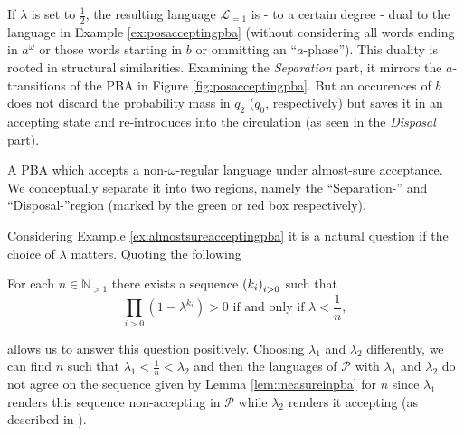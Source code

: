 \begin{example}
  If $\lambda$ is set to $\frac{1}{2}$, the resulting language 
  $\mathcal{L}_{=1}$ is - to a certain degree - dual to the language in Example 
  \ref{ex:posacceptingpba} (without considering all words ending in 
  $a^{\omega}$ or those words starting in $b$ or ommitting an 
  \enquote{$a$-phase}). This duality is rooted in structural similarities. 
  Examining the \emph{Separation} part, it mirrors the $a$-transitions of the 
  \ac{PBA} in Figure \ref{fig:posacceptingpba}. But an occurences of $b$ does 
  not discard the probability mass in $q_{2}$ ($q_0$, respectively) but saves
  it in an accepting state and re-introduces into the circulation (as seen in 
  the \emph{Disposal} part).
  \label{ex:almostsureacceptingpba}
\end{example}
\begin{drawing}
  \caption{A \ac{PBA} which accepts a non-$\omega$-regular language under
  almost-sure acceptance. We conceptually separate it into two regions, namely
  the \enquote{Separation-} and \enquote{Disposal-}region (marked by the green
  or red box respectively).}
  \label{fig:almostsureacceptingpba}
  \begin{center}
  \end{center}
\end{drawing}
Considering Example \ref{ex:almostsureacceptingpba} it is a natural question if
the choice of $\lambda$ matters. Quoting the following
\begin{lemma}
  \cite[Lemma 1]{DecProblemsForProbAuto}
  For each $n\in\mathbb{N}_{>1}$ there exists a sequence $\left(k_{i}\right)_{i>0}$
  such that
  \begin{equation*}
    \prod_{i>0}(1-\lambda^{k_{i}}) > 0 \text{ if and only if }
    \lambda<\frac{1}{n},
  \end{equation*}
  \label{lem:measureinpba}
\end{lemma}
allows us to answer this question positively. Choosing $\lambda_{1}$ and
$\lambda_{2}$ differently, we can find $n$ such that 
$\lambda_{1} < \frac{1}{n} < \lambda_{2}$ and then the languages of 
$\mathcal{P}$ with $\lambda_{1}$ and $\lambda_{2}$ do not agree on the sequence
given by Lemma \ref{lem:measureinpba} for $n$ since $\lambda_{1}$ renders
this sequence non-accepting in $\mathcal{P}$ while $\lambda_{2}$ renders it
accepting (as described in \cite{DecProblemsForProbAuto}).

